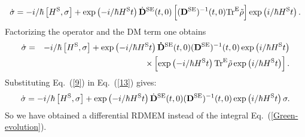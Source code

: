\documentclass[12pt,twoside,a4paper]{report}
\begin{document}
\begin{equation} 
\dot
{\sigma}
           =   
              -   i/\hbar 
                  \left[
                       H^{\rm S},\sigma 
                  \right] 
             +    \exp \left( 
                            -  i/\hbar H^{\rm S}t
                       \right) 
                   \dot{\bf D}
                                ^{\rm SE}
                                {\left( t,0\right) }
                               \left[  
                                           ({\bf D }^{\rm SE})
                                                    ^{-1}
                                                     {\left( t,0\right) }
                                {\rm Tr}^{\rm E}
                                 {\tilde{\rho}}
                              \right] 
                              \exp 
                                  \left(
                                          i/\hbar H^{\rm S}t
                                  \right). 
\end{equation} 
Factorizing the operator and the DM term one obtains
\begin{eqnarray} 
\dot
{\sigma}
          &=&
               -   i/\hbar 
                   \left[ H^{\rm S},\sigma \right] 
               +   \exp \left( -i/\hbar H^{\rm S}t\right) 
                   \mathbf{\dot{D}}
                                 ^{\rm SE}
                                 {\left( t,0\right) } 
                  ({\bf D}^{\rm SE})
                                                 ^{-1}
                                                 {\left( t,0\right) }
                 \exp \left( i/\hbar H^{\rm S}t\right)  
                 \nonumber  \label{13} \\ 
          & &    \times 
                 \left[ 
                     \exp \left( -i/\hbar H^{\rm S}t \right) 
                     {\rm Tr}^{\rm E}
                     { \tilde{\rho}}
                     \exp \left( i/\hbar H^{\rm S}t\right) 
                 \right].  
\end{eqnarray} 
Substituting Eq.~(\ref{9}) in Eq.~(\ref{13}) gives:  
\begin{equation} 
\dot
{\sigma}
          =  
             -  i/\hbar 
                \left[ H^{\rm S},\sigma \right] 
             +  \exp \left( -i/\hbar H^{\rm S}t\right) 
                {\dot{\bf D}}^{\rm SE}{\left( t,0\right) }%
                ({\bf D}^{\rm SE})^{-1}              
                                                {\left( t,0\right) }
                \exp \left( i/\hbar H^{\rm S}t\right) 
                \sigma.  \label{dif-RDM-general}%
\end{equation} 
So we have obtained a differential 
RDMEM instead of the integral Eq.~(\ref{Green-evolution}). 
\end{document}
